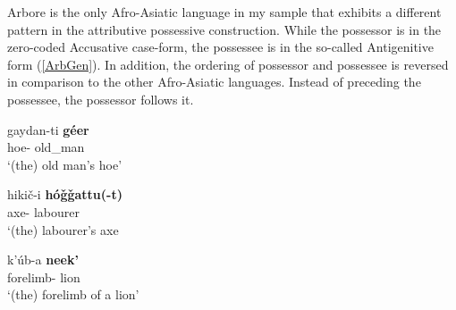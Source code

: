 {Arbore} is the only Afro-Asiatic language in my sample that exhibits a different pattern in the attributive possessive construction.
While the possessor is in the zero-coded Accusative case-form, the possessee is in the so-called Antigenitive form (\ref{ArbGen}).
In addition, the ordering of possessor and possessee is reversed in comparison to the other Afro-Asiatic languages. 
Instead of preceding the possessee, the possessor follows it.

 
\begin{exe}\ex\label{ArbGen}
\begin{xlist}
\ex\gll gaydan-ti \textbf{g\'eer}\\
 hoe-\antgen{} old\_man\\
\glt  `(the) old man's hoe'
 

\ex\gll hiki\v c-i \textbf{h\'o\v g\v gattu(-t)}\\
axe-\antgen{} labourer\\
\glt `(the) labourer's axe

\ex\gll k'\'ub-a \textbf{neek'}\\
forelimb-\antgen{}  lion\\
\glt `(the) forelimb of a lion'
\end{xlist}
\end{exe}




